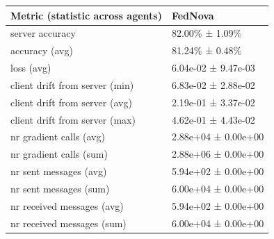 \begin{tabular}{ll}
\hline
 Metric (statistic across agents)   & FedNova             \\
\hline
 server accuracy                    & 82.00\% ± 1.09\%      \\
 accuracy (avg)                     & 81.24\% ± 0.48\%      \\
 loss (avg)                         & 6.04e-02 ± 9.47e-03 \\
 client drift from server (min)     & 6.83e-02 ± 2.88e-02 \\
 client drift from server (avg)     & 2.19e-01 ± 3.37e-02 \\
 client drift from server (max)     & 4.62e-01 ± 4.43e-02 \\
 nr gradient calls (avg)            & 2.88e+04 ± 0.00e+00 \\
 nr gradient calls (sum)            & 2.88e+06 ± 0.00e+00 \\
 nr sent messages (avg)             & 5.94e+02 ± 0.00e+00 \\
 nr sent messages (sum)             & 6.00e+04 ± 0.00e+00 \\
 nr received messages (avg)         & 5.94e+02 ± 0.00e+00 \\
 nr received messages (sum)         & 6.00e+04 ± 0.00e+00 \\
\hline
\end{tabular}
